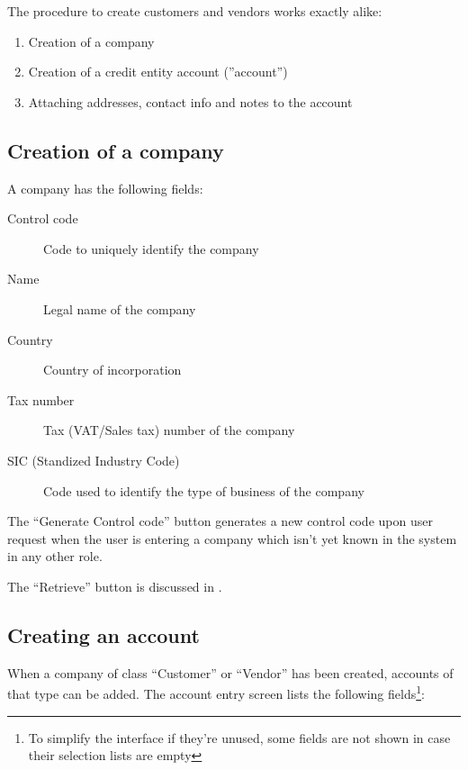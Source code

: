 The procedure to create customers and vendors works exactly alike:

\begin{enumerate}
\item Creation of a company
\item Creation of a credit entity account (''account'')
\item Attaching addresses, contact info and notes to the account 
\end{enumerate}

\subsection{Creation of a company}

A company has the following fields:

\begin{description}
\item [Control code] Code to uniquely identify the company
\item [Name] Legal name of the company
\item [Country] Country of incorporation
\item [Tax number] Tax (VAT/Sales tax) number of the company
\item [SIC (Standized Industry Code)] Code used to identify
    the type of business of the company
\end{description}

The ``Generate Control code'' button generates a new control code upon
user request when the user is entering a company which isn't yet known
in the system in any other role.

The ``Retrieve'' button is discussed in .


\subsection{Creating an account}
\label{subsec:customers-creating-account}

When a company of class ``Customer'' or ``Vendor'' has been created,
accounts of that type can be added. The account entry screen lists the
following fields\footnote{To simplify the interface if they're unused, some fields
are not shown in case their selection lists are empty}:

